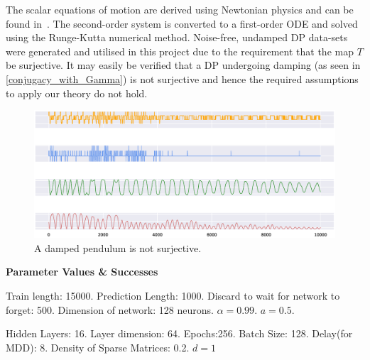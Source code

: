 \documentclass[a4paper,12pt,twoside]{report}
\begin{document}
The scalar equations of motion are derived using Newtonian physics and can be found in~\cite{DPFormulas}. The second-order system is converted to a first-order ODE and solved using the Runge-Kutta numerical method.  Noise-free, undamped DP data-sets were generated and utilised in this project due to the requirement that the map $T$ be surjective.
It may easily be verified that a DP undergoing damping (as seen in \ref{conjugacy_with_Gamma}) is not surjective and hence the required assumptions to apply our theory do not hold. 

\begin{figure}[ht]
  \includegraphics[scale=0.4]{_dp_dying.eps}
  \centering
\caption{A damped pendulum is not surjective.}
\label{fig:damped_pendulum}
\end{figure}


\textbf{Parameter Values \& Successes}

Train length: 15000. Prediction Length: 1000. Discard to wait for network to forget: 500. Dimension of network: 128 neurons.
$\alpha=0.99$. $a=0.5$. 

Hidden Layers: 16. Layer dimension: 64. Epochs:256. Batch Size: 128. Delay(for MDD): 8. Density of Sparse Matrices: 0.2. $d=1$

\end{document}
